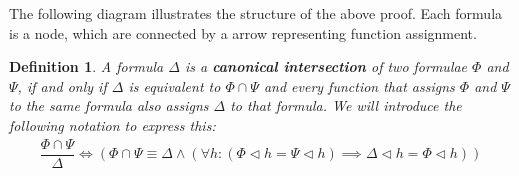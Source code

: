 \documentclass{article}
\newtheorem{defin}{Definition}
\begin{document}
The following diagram illustrates the structure of the above proof.
Each formula is a node, which are connected by a arrow representing function assignment.

\begin{center}
\end{center}

\begin{defin}
A formula $\Delta$ is a \textbf{canonical intersection} of two formulae $\Phi$ and $\Psi$, if and only if 
$\Delta$ is equivalent to $\Phi\cap\Psi$ and every function that assigns $\Phi$ and $\Psi$ to the same formula also assigns $\Delta$ to that formula.
We will introduce the following notation to express this:
\begin{align*}
\dfrac{\Phi \cap \Psi}{\Delta} \iff (\Phi\cap\Psi\equiv\Delta\land(\forall h : (\Phi\lhd h =\Psi\lhd h) \implies \Delta\lhd h=\Phi\lhd h))
\end{align*}
\end{defin}
\end{document}
